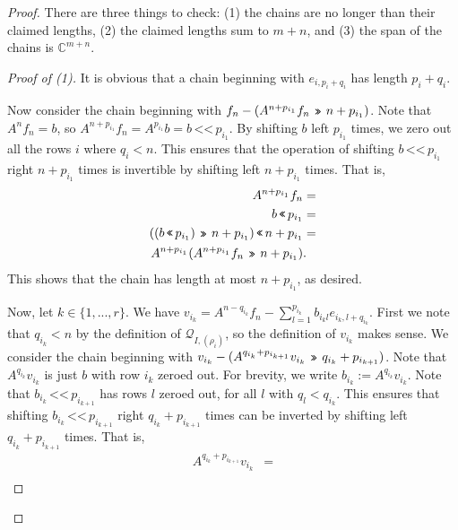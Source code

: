 \documentclass[12pt,psamsfonts]{article}
\newcommand{\leftshift}{\,\texttt{<<}\,}
\newcommand{\rightshift}{\mathbin{\rotatebox[origin=c]{180}{\leftshift}}}
\begin{document}
\begin{proof}
    There are three things to check: (1) the chains are no longer than their claimed lengths, (2) the claimed lengths sum to \(m + n\), and (3) the span of the chains is \(\mathbb{C}^{m + n}\).
    \begin{proof}[Proof of (1)]
        It is obvious that a chain beginning with \(e_{i, p_i + q_i}\) has length \(p_i + q_i\).
        \par Now consider the chain beginning with \(f_n - (A^{n + p_{i_1}} f_n \rightshift n + p_{i_1})\).
        Note that \(A^n f_n = b\), so \(A^{n + p_{i_1}} f_n = A^{p_{i_1}} b = b \leftshift p_{i_1}\).
        By shifting \(b\) left \(p_{i_1}\) times, we zero out all the rows \(i\) where \(q_i < n\).
        This ensures that the operation of shifting \(b \leftshift p_{i_1}\) right \(n + p_{i_1}\) times is invertible by shifting left \(n + p_{i_1}\) times.
        That is,
        \begin{align*}
            A^{n + p_{i_1}} f_n & = \\
            b \leftshift p_{i_1} & = \\
            ((b \leftshift p_{i_1}) \rightshift n + p_{i_1}) \leftshift n + p_{i_1} & = \\
            A^{n + p_{i_1}}(A^{n + p_{i_1}}f_n \rightshift n + p_{i_1}) & .
        \end{align*}
        This shows that the chain has length at most \(n + p_{i_1}\), as desired.
        \par Now, let \(k \in \{1, ..., r\}\).
        We have \(v_{i_k} = A^{n - q_{i_k}} f_n - \sum_{l = 1}^{p_{i_k}} b_{i_kl} e_{i_k,l + q_{i_k}}\).
        First we note that \(q_{i_k} < n\) by the definition of \(\mathcal{Q}_{I, (\rho_i)}\), so the definition of \(v_{i_k}\) makes sense.
        We consider the chain beginning with \(v_{i_k} - (A^{q_{i_k} + p_{i_{k + 1}}} v_{i_k} \rightshift q_{i_k} + p_{i_{k + 1}})\).
        Note that \(A^{q_{i_k}} v_{i_k}\) is just \(b\) with row \(i_k\) zeroed out.
        For brevity, we write \(b_{i_k} := A^{q_{i_k}} v_{i_k}\).
        Note that \(b_{i_k} \leftshift p_{i_{k + 1}}\) has rows \(l\) zeroed out, for all \(l\) with \(q_l < q_{i_k}\).
        This ensures that shifting \(b_{i_k} \leftshift p_{i_{k + 1}}\) right \(q_{i_k} + p_{i_{k + 1}}\) times can be inverted by shifting left \(q_{i_k} + p_{i_{k + 1}}\) times.
        That is,
        \begin{align*}
            A^{q_{i_k} + p_{i_{k + 1}}} v_{i_k} & = \\

\end{align*}
\end{proof}
\end{proof}
\end{document}
